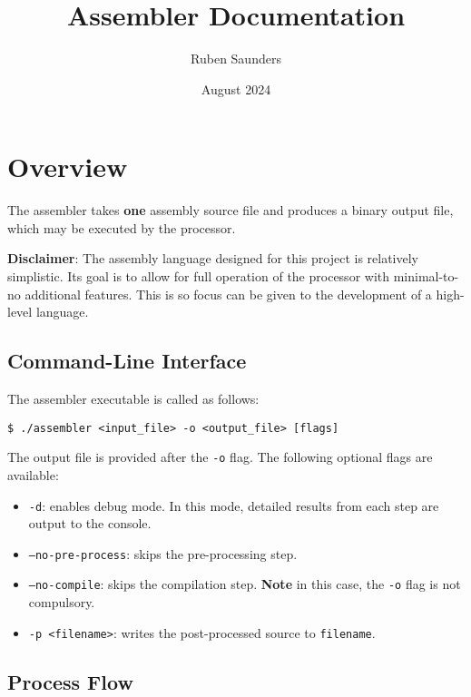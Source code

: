 \documentclass{article}
\title{Assembler Documentation}
\author{Ruben Saunders}
\date{August 2024}
\begin{document}
\maketitle

\section{Overview}

The assembler takes \textbf{one} assembly source file and produces a binary output file, which may be executed by the processor.

\textbf{Disclaimer}: The assembly language designed for this project is relatively simplistic.
Its goal is to allow for full operation of the processor with minimal-to-no additional features.
This is so focus can be given to the development of a high-level language.

\subsection{Command-Line Interface}

The assembler executable is called as follows:

\medskip
\begin{lstlisting}[style=bashconsole]
$ ./assembler <input_file> -o <output_file> [flags]
\end{lstlisting}

The output file is provided after the \texttt{-o} flag.
The following optional flags are available:
\begin{itemize}
    \item \texttt{-d}: enables debug mode.
    In this mode, detailed results from each step are output to the console.
    \item \texttt{--no-pre-process}: skips the pre-processing step.
    \item \texttt{--no-compile}: skips the compilation step.
    \textbf{Note} in this case, the \texttt{-o} flag is not compulsory.
    \item \texttt{-p <filename>}: writes the post-processed source to \texttt{filename}.
\end{itemize}

\subsection{Process Flow}
\end{document}
